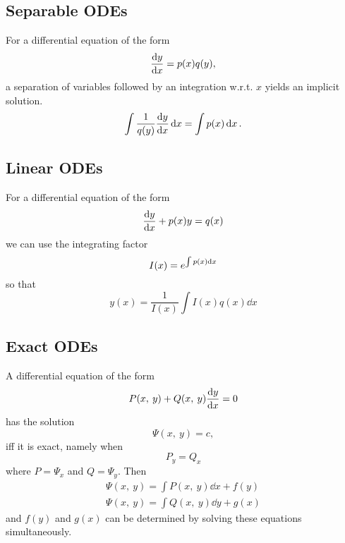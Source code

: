 \documentclass{article}
\begin{document}
\subsection{Separable ODEs}
For a differential equation of the form
\begin{equation*}
    \dv{y}{x} = p(x) q(y),
\end{equation*}
a separation of variables followed by an integration w.r.t. $x$ yields an implicit solution.
\begin{equation*}
    \int \frac{1}{q(y)} \dv{y}{x} \dd{x} = \int p(x) \dd{x}.
\end{equation*}
\subsection{Linear ODEs}
For a differential equation of the form
\begin{equation*}
    \dv{y}{x} + p(x)y = q(x)
\end{equation*}
we can use the integrating factor
\begin{equation*}
    I(x) = e^{\int p(x) \dd{x}}
\end{equation*}
so that
\begin{equation*}
    y(x) = \frac{1}{I(x)} \int I(x) q(x) \dd{x}
\end{equation*}
\subsection{Exact ODEs}
A differential equation of the form
\begin{equation*}
    P(x,\: y) + Q(x,\: y)\dv{y}{x} = 0
\end{equation*}
has the solution
\begin{equation*}
    \Psi(x,\: y) = c,
\end{equation*}
iff it is exact, namely when
\begin{equation*}
    P_y = Q_x
\end{equation*}
where $P = \Psi_x$ and $Q = \Psi_y$. Then
\begin{gather*}
    \Psi(x,\: y) = \int P(x,\: y) \dd{x} + f(y) \\
    \Psi(x,\: y) = \int Q(x,\: y) \dd{y} + g(x)
\end{gather*}
and $f(y)$ and $g(x)$ can be determined by solving these equations simultaneously.
\newpage
\end{document}
